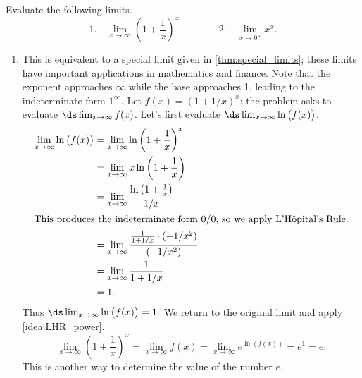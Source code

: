 \begin{example}\label{ex_LHR4}
Evaluate the following limits.
\[
 \text{1.}\quad\lim_{x\to\infty} \left(1+\frac1x\right)^x \qquad\qquad
 \text{2.}\quad\lim_{x\to0^+} x^x.
\]
\solution
\begin{enumerate}
\item		This is equivalent to a special limit given in \autoref{thm:special_limits}; these limits have important applications in mathematics and finance. Note that the exponent approaches $\infty$ while the base approaches 1, leading to the indeterminate form $1^\infty$. Let $f(x) = (1+1/x)^x$; the problem asks to evaluate $\ds\lim_{x\to\infty}f(x)$. Let's first evaluate $\ds \lim_{x\to\infty}\ln\big(f(x)\big)$.
\begin{align*}
\lim_{x\to\infty}\ln\big(f(x)\big)
			&= \lim_{x\to\infty} \ln \left(1+\frac1x\right)^x \\
			&= \lim_{x\to\infty} x\ln\left(1+\frac1x\right)\\
			&= \lim_{x\to\infty} \frac{\ln\left(1+\frac1x\right)}{1/x}\\
			\intertext{This produces the indeterminate form 0/0, so we apply L'H\^opital's Rule.}
			&=	\lim_{x\to\infty} \frac{\frac{1}{1+1/x}\cdot(-1/x^2)}{(-1/x^2)} \\
			&= \lim_{x\to\infty}\frac{1}{1+1/x}\\
			&= 1.
\end{align*}
Thus $\ds\lim_{x\to\infty} \ln \big(f(x)\big) = 1.$ We return to the original limit and apply \autoref{idea:LHR_power}.
\[\lim_{x\to\infty}\left(1+\frac1x\right)^x = \lim_{x\to\infty} f(x) =  \lim_{x\to\infty}e^{\ln (f(x))} = e^1 = e.\]
This is another way to determine the value of the number $e$.


\end{enumerate}
\end{example}
